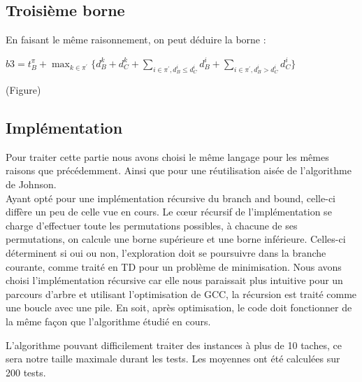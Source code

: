 \documentclass[12pt]{article}
\begin{document}
\subsection{Troisième borne}

En faisant le même raisonnement, on peut déduire la borne :\\


\begin{center}


 $b3 = t_B^\pi + \displaystyle\max_{k \in \pi^\prime}\{d_B^k + d_C^k + \displaystyle\sum_{i \in \pi^\prime,d_B^i \le d_C^i} d_B^i + \displaystyle\sum_{i \in \pi^\prime,d_B^i > d_C^i} d_C^i\} $\\
\end{center}

(Figure)

\subsection{Implémentation}

Pour traiter cette partie nous avons choisi le même langage pour les mêmes raisons que précédemment. Ainsi que pour une réutilisation aisée de l'algorithme de Johnson.\\

Ayant opté pour une implémentation récursive du branch and bound, celle-ci diffère un peu de celle vue en cours. Le cœur récursif de l'implémentation se charge d'effectuer toute les permutations possibles, à chacune de ses permutations, on calcule une borne supérieure et une borne inférieure. Celles-ci déterminent si oui ou non, l'exploration doit se poursuivre dans la branche courante, comme traité en TD pour un problème de minimisation. Nous avons choisi l'implémentation récursive car elle nous paraissait plus intuitive pour un parcours d'arbre et utilisant l'optimisation de GCC, la récursion est traité comme une boucle avec une pile. En soit, après optimisation, le code doit fonctionner de la même façon que l'algorithme étudié en cours. 

L'algorithme pouvant difficilement traiter des instances à plus de 10 taches, ce sera notre taille maximale durant les tests. Les moyennes ont été calculées sur 200 tests.
\end{document}
